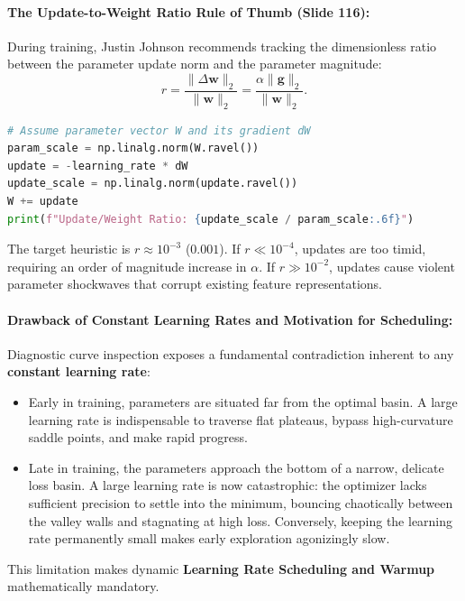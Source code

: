 \paragraph{The Update-to-Weight Ratio Rule of Thumb (Slide 116):}
During training, Justin Johnson recommends tracking the dimensionless ratio between the parameter update norm and the parameter magnitude:
\begin{equation}
r = \frac{\|\Delta \mathbf{w}\|_2}{\|\mathbf{w}\|_2} = \frac{\alpha \|\mathbf{g}\|_2}{\|\mathbf{w}\|_2}.
\label{eq:update_to_weight_ratio}
\end{equation}
\begin{lstlisting}[language=Python, caption={Tracking update-to-weight magnitude ratio in Python.}]
# Assume parameter vector W and its gradient dW
param_scale = np.linalg.norm(W.ravel())
update = -learning_rate * dW
update_scale = np.linalg.norm(update.ravel())
W += update
print(f"Update/Weight Ratio: {update_scale / param_scale:.6f}")
\end{lstlisting}
The target heuristic is $r \approx 10^{-3}$ ($0.001$). If $r \ll 10^{-4}$, updates are too timid, requiring an order of magnitude increase in $\alpha$. If $r \gg 10^{-2}$, updates cause violent parameter shockwaves that corrupt existing feature representations.

\paragraph{Drawback of Constant Learning Rates and Motivation for Scheduling:}
Diagnostic curve inspection exposes a fundamental contradiction inherent to any \textbf{constant learning rate}:
\begin{itemize}[noitemsep,topsep=2pt,parsep=0pt,partopsep=0pt]
  \item Early in training, parameters are situated far from the optimal basin. A large learning rate is indispensable to traverse flat plateaus, bypass high-curvature saddle points, and make rapid progress.
  \item Late in training, the parameters approach the bottom of a narrow, delicate loss basin. A large learning rate is now catastrophic: the optimizer lacks sufficient precision to settle into the minimum, bouncing chaotically between the valley walls and stagnating at high loss. Conversely, keeping the learning rate permanently small makes early exploration agonizingly slow.
\end{itemize}
This limitation makes dynamic \textbf{Learning Rate Scheduling and Warmup} mathematically mandatory.

